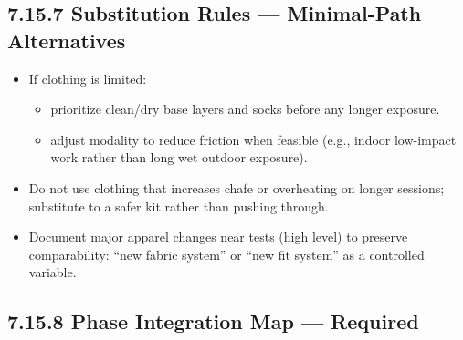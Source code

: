 \documentclass[10pt]{article}
\begin{document}
\subsection*{7.15.7 Substitution Rules — Minimal-Path Alternatives}
{}

\begin{itemize}
\item If clothing is limited:
  \begin{itemize}
  \item prioritize clean/dry base layers and socks before any longer exposure.
  \item adjust modality to reduce friction when feasible (e.g., indoor low-impact work rather than long wet outdoor exposure).
  \end{itemize}
\item Do not use clothing that increases chafe or overheating on longer sessions; substitute to a safer kit rather than pushing through.
\item Document major apparel changes near tests (high level) to preserve comparability: “new fabric system” or “new fit system” as a controlled variable.
\end{itemize}

\subsection*{7.15.8 Phase Integration Map — Required}
{}

\begingroup
\scriptsize
\setlength{\tabcolsep}{2pt}
\renewcommand{\arraystretch}{1.10}
\end{document}
